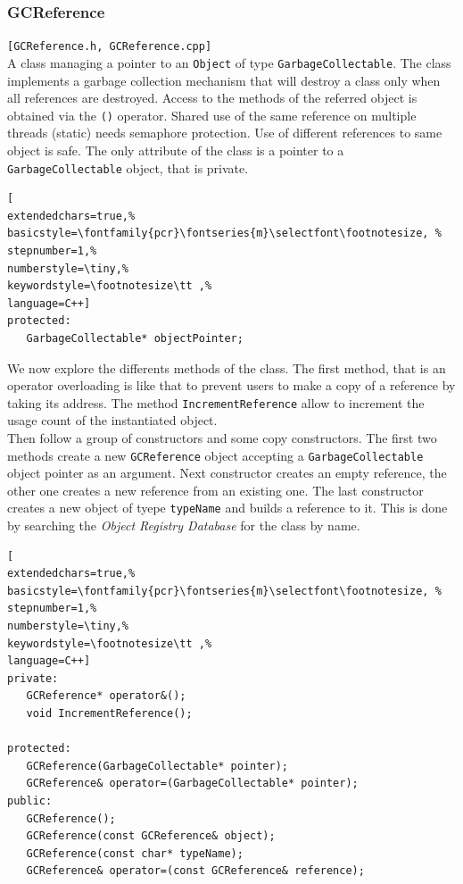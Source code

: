 \subsubsection{GCReference}
\texttt{[GCReference.h, GCReference.cpp]}\\
A class managing a pointer to an \texttt{Object} of type \texttt{GarbageCollectable}. The class implements a garbage collection mechanism that will destroy a class only when all references are destroyed. Access to the methods of the referred object is obtained via the \texttt{()} operator. Shared use of the same reference on multiple threads (static) needs semaphore protection. Use of different references to same object is safe. The only attribute of the class is a pointer to a \texttt{GarbageCollectable} object, that is private.

\begin{lstlisting}[
extendedchars=true,%
basicstyle=\fontfamily{pcr}\fontseries{m}\selectfont\footnotesize, %
stepnumber=1,%
numberstyle=\tiny,%
keywordstyle=\footnotesize\tt ,%
language=C++]
protected:
   GarbageCollectable* objectPointer;
\end{lstlisting}

We now explore the differents methods of the class. The first method, that is an operator overloading is like that to prevent users to make a copy of a reference by taking its address. The method \texttt{IncrementReference} allow to increment the usage count of the instantiated object. \\


Then follow a group of constructors and some copy constructors. The first two methods create a new \texttt{GCReference} object accepting a \texttt{GarbageCollectable} object pointer as an argument. Next constructor creates an empty reference, the other one creates a new reference from an existing one. The last constructor creates a new object of tyepe \texttt{typeName} and builds a reference to it. This is done by searching the \textit{Object Registry Database} for the class by name.

\begin{lstlisting}[
extendedchars=true,%
basicstyle=\fontfamily{pcr}\fontseries{m}\selectfont\footnotesize, %
stepnumber=1,%
numberstyle=\tiny,%
keywordstyle=\footnotesize\tt ,%
language=C++]
private:
   GCReference* operator&();
   void IncrementReference();

protected:
   GCReference(GarbageCollectable* pointer);
   GCReference& operator=(GarbageCollectable* pointer);
public:
   GCReference();
   GCReference(const GCReference& object);
   GCReference(const char* typeName);
   GCReference& operator=(const GCReference& reference);
\end{lstlisting}

